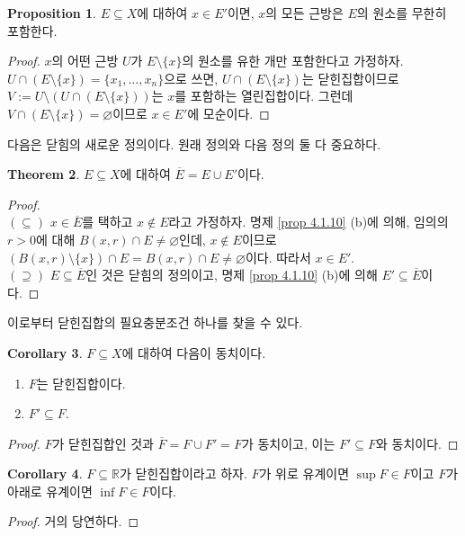 \documentclass[11pt]{book}
\numberwithin{equation}{chapter}
\def\RR{\mathbb{R}}
\theoremstyle{definition}
\newtheorem{thm}{Theorem}[section]
\newtheorem{cor}[thm]{Corollary}
\newtheorem{prop}[thm]{Proposition}
\begin{document}
\begin{prop}
    \(E \subseteq X\)에 대하여 \(x \in E'\)이면, \(x\)의 모든 근방은 \(E\)의 원소를 무한히 포함한다.
\end{prop}
\begin{proof}
    \(x\)의 어떤 근방 \(U\)가 \(E \setminus \{x\}\)의 원소를 유한 개만 포함한다고 가정하자. \(U \cap (E \setminus \{x\}) = \{x_1, \ldots, x_n\}\)으로 쓰면, \(U \cap (E \setminus \{x\})\)는 닫힌집합이므로 \(V := U \setminus (U \cap (E \setminus \{x\}))\)는 \(x\)를 포함하는 열린집합이다. 그런데 \(V \cap (E \setminus \{x\}) = \varnothing\)이므로 \(x \in E'\)에 모순이다.
\end{proof}

다음은 닫힘의 새로운 정의이다. 원래 정의와 다음 정의 둘 다 중요하다.

\begin{thm}
    \(E \subseteq X\)에 대하여 \(\overline{E} = E \cup E'\)이다.
\end{thm}
\begin{proof}
    \quad\\
    \((\subseteq)\) \(x \in \overline{E}\)를 택하고 \(x \notin E\)라고 가정하자. 명제 \ref{prop 4.1.10} (b)에 의해, 임의의 \(r > 0\)에 대해 \(B(x, r) \cap E \ne \varnothing\)인데, \(x \notin E\)이므로 \((B(x, r) \setminus \{x\}) \cap E = B(x, r) \cap E \ne \varnothing\)이다. 따라서 \(x \in E'\).\\
    \((\supseteq)\) \(E \subseteq \overline{E}\)인 것은 닫힘의 정의이고, 명제 \ref{prop 4.1.10} (b)에 의해 \(E' \subseteq \overline{E}\)이다.
\end{proof}

이로부터 닫힌집합의 필요충분조건 하나를 찾을 수 있다.

\begin{cor}
    \(F \subseteq X\)에 대하여 다음이 동치이다.
    \begin{enumerate}[label=(\alph*), leftmargin=2\parindent]
        \item \(F\)는 닫힌집합이다.
        \item \(F' \subseteq F\).
    \end{enumerate}
\end{cor}
\begin{proof}
    \(F\)가 닫힌집합인 것과 \(\overline{F} = F \cup F' = F\)가 동치이고, 이는 \(F' \subseteq F\)와 동치이다.
\end{proof}

\begin{cor} \label{cor 4.2.6}
    \(F \subseteq \RR\)가 닫힌집합이라고 하자. \(F\)가 위로 유계이면 \(\sup F \in F\)이고 \(F\)가 아래로 유계이면 \(\inf F \in F\)이다.
\end{cor}
\begin{proof}
    거의 당연하다.
\end{proof}
\end{document}
